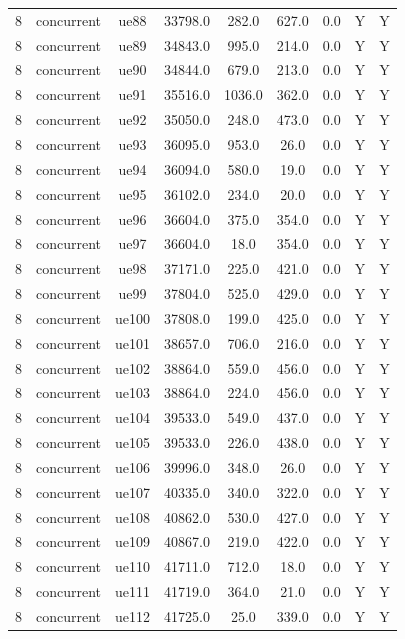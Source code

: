 \begin{table}[ht]
\begin{tabular}{|c|c|c|c|c|c|c|c|c|}
8 & concurrent & ue88 & 33798.0 & 282.0 & 627.0 & 0.0 & Y & Y \\
8 & concurrent & ue89 & 34843.0 & 995.0 & 214.0 & 0.0 & Y & Y \\
8 & concurrent & ue90 & 34844.0 & 679.0 & 213.0 & 0.0 & Y & Y \\
8 & concurrent & ue91 & 35516.0 & 1036.0 & 362.0 & 0.0 & Y & Y \\
8 & concurrent & ue92 & 35050.0 & 248.0 & 473.0 & 0.0 & Y & Y \\
8 & concurrent & ue93 & 36095.0 & 953.0 & 26.0 & 0.0 & Y & Y \\
8 & concurrent & ue94 & 36094.0 & 580.0 & 19.0 & 0.0 & Y & Y \\
8 & concurrent & ue95 & 36102.0 & 234.0 & 20.0 & 0.0 & Y & Y \\
8 & concurrent & ue96 & 36604.0 & 375.0 & 354.0 & 0.0 & Y & Y \\
8 & concurrent & ue97 & 36604.0 & 18.0 & 354.0 & 0.0 & Y & Y \\
8 & concurrent & ue98 & 37171.0 & 225.0 & 421.0 & 0.0 & Y & Y \\
8 & concurrent & ue99 & 37804.0 & 525.0 & 429.0 & 0.0 & Y & Y \\
8 & concurrent & ue100 & 37808.0 & 199.0 & 425.0 & 0.0 & Y & Y \\
8 & concurrent & ue101 & 38657.0 & 706.0 & 216.0 & 0.0 & Y & Y \\
8 & concurrent & ue102 & 38864.0 & 559.0 & 456.0 & 0.0 & Y & Y \\
8 & concurrent & ue103 & 38864.0 & 224.0 & 456.0 & 0.0 & Y & Y \\
8 & concurrent & ue104 & 39533.0 & 549.0 & 437.0 & 0.0 & Y & Y \\
8 & concurrent & ue105 & 39533.0 & 226.0 & 438.0 & 0.0 & Y & Y \\
8 & concurrent & ue106 & 39996.0 & 348.0 & 26.0 & 0.0 & Y & Y \\
8 & concurrent & ue107 & 40335.0 & 340.0 & 322.0 & 0.0 & Y & Y \\
8 & concurrent & ue108 & 40862.0 & 530.0 & 427.0 & 0.0 & Y & Y \\
8 & concurrent & ue109 & 40867.0 & 219.0 & 422.0 & 0.0 & Y & Y \\
8 & concurrent & ue110 & 41711.0 & 712.0 & 18.0 & 0.0 & Y & Y \\
8 & concurrent & ue111 & 41719.0 & 364.0 & 21.0 & 0.0 & Y & Y \\
8 & concurrent & ue112 & 41725.0 & 25.0 & 339.0 & 0.0 & Y & Y \\

\end{tabular}
\end{table}
